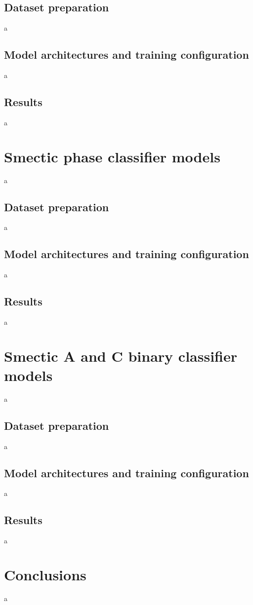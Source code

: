 \documentclass[12pt]{article}
\begin{document}
\subsection{Dataset preparation}
a
\subsection{Model architectures and training configuration}
a
\subsection{Results}
a
\section{Smectic phase classifier models}
a
\subsection{Dataset preparation}
a
\subsection{Model architectures and training configuration}
a
\subsection{Results}
a
\section{Smectic A and C binary classifier models}
a
\subsection{Dataset preparation}
a
\subsection{Model architectures and training configuration}
a
\subsection{Results}
a
\section{Conclusions}
a
\end{document}
